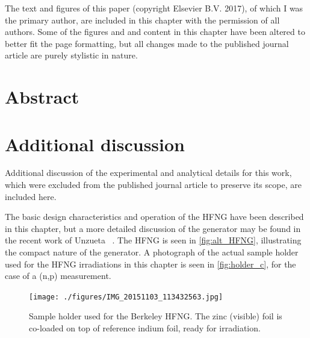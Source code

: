 \vspace{0.5cm}



The text and figures of this paper (copyright Elsevier B.V. 2017), of which I was the primary author, are
included in this chapter with the permission of all authors. 
Some of the figures and and content in this chapter have been altered to better fit the page formatting, but all changes made to the published journal article are purely stylistic in nature.


% 



% 
% 
\section{Abstract}



% 
% 




%
% 
\section{Additional discussion} \label{sec:extra_np}

Additional discussion of the experimental and analytical details for this work, which were excluded from the published journal article to preserve its scope, are included here.



The basic design characteristics and operation of the HFNG have been described in this chapter, but a more detailed discussion of the generator may be found in the recent work of Unzueta \etal\ \cite{ayllon2018design}. 
The HFNG is seen in  \autoref{fig:alt_HFNG}, illustrating the compact nature of the generator.
A photograph of the actual sample holder used for the HFNG irradiations in this chapter is seen in \autoref{fig:holder_c}, for the case of a  (n,p) measurement.


\begin{figure}
    \centering
        \texttt{[image: ./figures/IMG\_20151103\_113432563.jpg]}
        \caption{Sample holder used for the Berkeley HFNG. The zinc (visible) foil is co-loaded on top of reference indium foil, ready for irradiation.}
        \label{fig:holder_c}
\end{figure}


